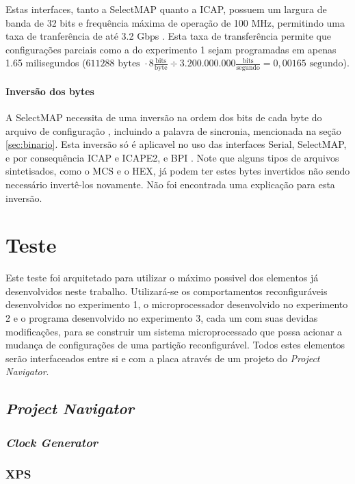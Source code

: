 \documentclass[11pt,a4paper,oneside]{book}
\begin{document}
Estas interfaces, tanto a SelectMAP quanto a ICAP, possuem um largura de banda de 32 bits e frequência máxima de operação de 100 MHz, permitindo uma taxa de tranferência de até 3.2 Gbps \cite{ug702}.
Esta taxa de transferência permite que configurações parciais como a do experimento 1 sejam programadas em apenas 1.65 milisegundos ($611288\text{ bytes }\cdot8\frac{\text{bits}}{\text{byte}}\div3.200.000.000\frac{\text{bits}}{\text{segundo}} = 0,00165 \text{ segundo}$).

\paragraph{Inversão dos bytes}
A SelectMAP necessita de uma inversão na ordem dos bits de cada byte do arquivo de configuração \cite{xapp502}, incluindo a palavra de sincronia, mencionada na seção \ref{sec:binario}.
Esta inversão só é aplicavel no uso das interfaces Serial, SelectMAP, e por consequência ICAP e ICAPE2, e BPI \cite{ug470}.
Note que alguns tipos de arquivos sintetisados, como o MCS e o HEX, já podem ter estes bytes invertidos não sendo necessário invertê-los novamente.
Não foi encontrada uma explicação para esta inversão.

\section{Teste}
Este teste foi arquitetado para utilizar o máximo possivel dos elementos já desenvolvidos  neste trabalho.
Utilizará-se os comportamentos reconfiguráveis desenvolvidos no experimento 1, o microprocessador desenvolvido no experimento 2 e o programa desenvolvido no experimento 3, cada um com suas devidas modificações, para se construir um sistema microprocessado que possa acionar a mudança de configurações de uma partição reconfigurável.
Todos estes elementos serão interfaceados entre si e com a placa através de um projeto do \textit{Project Navigator}.

\subsection{\textit{Project Navigator}}

\subsubsection{\textit{Clock Generator}}

\subsubsection{XPS}
\end{document}
